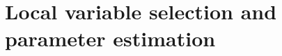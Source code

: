 \documentclass[12pt,t]{beamer}
\newcommand{\subt}[1]{{\footnotesize \color{subtitle} {#1}}}
\begin{document}
\begin{comment}
\begin{frame}{Geographically weighted regression}
\subt{Bandwidth estimation via GCV (Wahba, 1990)}

\bigskip
\begin{itemize}
    \item The GCV criterion for bandwidth selection is:
    \begin{align*}
      \text{GCV} = \frac{\sum_{i=1}^n \left(y_i - \hat{y}_i\right)^2}{(n-\nu)^2}
    \end{align*}
    \begin{itemize}
        \item $\hat{\bm{y}} = \bm{H}\bm{y}$
        \item $\nu = \text{tr}(\bm{H})$
        \item $\bm{H}_j = \left\{ \bm{W} \bm{X} (\bm{X}'\bm{W}\bm{X})^{-1} \bm{X} \right\}_j$
        \item Where subscript $j$ indicates the $j$th row of the matrix
    \end{itemize}
\end{itemize}

\note{Another way to estimate the GWR bandwidth is via Generalized Cross Validation as described in Wahba, 1990.}
\end{frame}
\end{comment}






\section{Local variable selection and parameter estimation}
\end{document}
